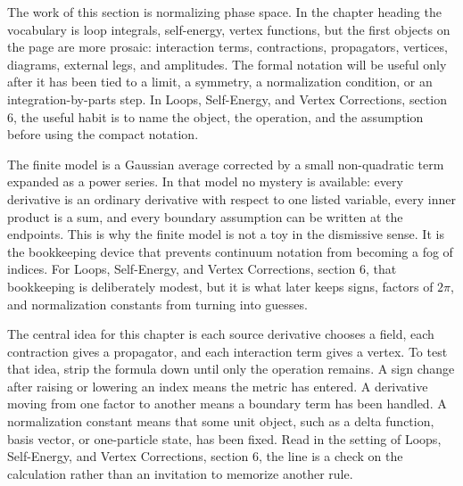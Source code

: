 











The work of this section is normalizing phase space.  In the chapter heading the vocabulary is loop integrals, self-energy, vertex functions, but the first objects on the page are more prosaic: interaction terms, contractions, propagators, vertices, diagrams, external legs, and amplitudes.  The formal notation will be useful only after it has been tied to a limit, a symmetry, a normalization condition, or an integration-by-parts step.  In Loops, Self-Energy, and Vertex Corrections, section 6, the useful habit is to name the object, the operation, and the assumption before using the compact notation.

The finite model is a Gaussian average corrected by a small non-quadratic term expanded as a power series.  In that model no mystery is available: every derivative is an ordinary derivative with respect to one listed variable, every inner product is a sum, and every boundary assumption can be written at the endpoints.  This is why the finite model is not a toy in the dismissive sense.  It is the bookkeeping device that prevents continuum notation from becoming a fog of indices.  For Loops, Self-Energy, and Vertex Corrections, section 6, that bookkeeping is deliberately modest, but it is what later keeps signs, factors of \(2\pi\), and normalization constants from turning into guesses.

The central idea for this chapter is each source derivative chooses a field, each contraction gives a propagator, and each interaction term gives a vertex.  To test that idea, strip the formula down until only the operation remains.  A sign change after raising or lowering an index means the metric has entered.  A derivative moving from one factor to another means a boundary term has been handled.  A normalization constant means that some unit object, such as a delta function, basis vector, or one-particle state, has been fixed.  Read in the setting of Loops, Self-Energy, and Vertex Corrections, section 6, the line is a check on the calculation rather than an invitation to memorize another rule.

